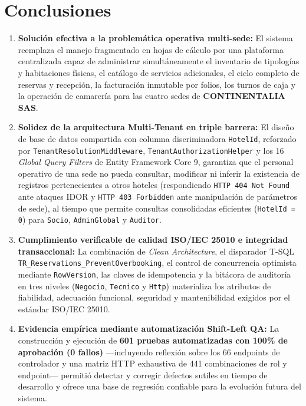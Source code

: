 \documentclass[12pt,a4paper]{article}
\begin{document}
\section{Conclusiones}

\begin{enumerate}
    \item \textbf{Soluci\'on efectiva a la problem\'atica operativa multi-sede:} El sistema reemplaza el manejo fragmentado en hojas de c\'alculo por una plataforma centralizada capaz de administrar simult\'aneamente el inventario de tipolog\'ias y habitaciones f\'isicas, el cat\'alogo de servicios adicionales, el ciclo completo de reservas y recepci\'on, la facturaci\'on inmutable por folios, los turnos de caja y la operaci\'on de camarer\'ia para las cuatro sedes de \textbf{CONTINENTALIA SAS}.
    \item \textbf{Solidez de la arquitectura Multi-Tenant en triple barrera:} El dise\~no de base de datos compartida con columna discriminadora \texttt{HotelId}, reforzado por \texttt{TenantResolutionMiddleware}, \texttt{TenantAuthorizationHelper} y los 16 \textit{Global Query Filters} de Entity Framework Core 9, garantiza que el personal operativo de una sede no pueda consultar, modificar ni inferir la existencia de registros pertenecientes a otros hoteles (respondiendo \texttt{HTTP 404 Not Found} ante ataques IDOR y \texttt{HTTP 403 Forbidden} ante manipulaci\'on de par\'ametros de sede), al tiempo que permite consultas consolidadas eficientes (\texttt{HotelId = 0}) para \texttt{Socio}, \texttt{AdminGlobal} y \texttt{Auditor}.
    \item \textbf{Cumplimiento verificable de calidad ISO/IEC 25010 e integridad transaccional:} La combinaci\'on de \textit{Clean Architecture}, el disparador T-SQL \texttt{TR\_Reservations\_PreventOverbooking}, el control de concurrencia optimista mediante \texttt{RowVersion}, las claves de idempotencia y la bit\'acora de auditor\'ia en tres niveles (\texttt{Negocio}, \texttt{Tecnico} y \texttt{Http}) materializa los atributos de fiabilidad, adecuaci\'on funcional, seguridad y mantenibilidad exigidos por el est\'andar ISO/IEC 25010.
    \item \textbf{Evidencia emp\'irica mediante automatizaci\'on Shift-Left QA:} La construcci\'on y ejecuci\'on de \textbf{601 pruebas automatizadas con 100\% de aprobaci\'on (0 fallos)} ---incluyendo reflexi\'on sobre los 66 endpoints de controlador y una matriz HTTP exhaustiva de 441 combinaciones de rol y endpoint--- permiti\'o detectar y corregir defectos sutiles en tiempo de desarrollo y ofrece una base de regresi\'on confiable para la evoluci\'on futura del sistema.
\end{enumerate}
\end{document}
